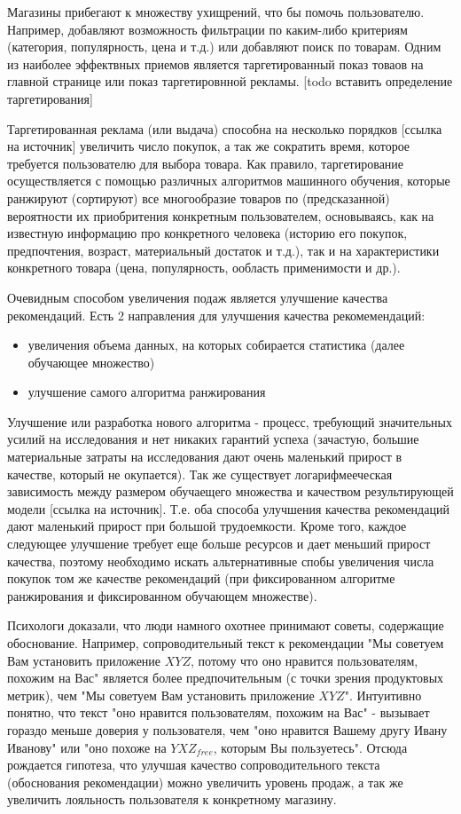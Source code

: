 \documentclass[12pt,a4paper]{report}
\begin{document}
Магазины прибегают к множеству ухищрений, что бы помочь пользователю. Например, добавляют возможность фильтрации по каким-либо критериям (категория, популярность, цена и т.д.) или добавляют поиск по товарам. Одним из наиболее эффектвных приемов является таргетированный показ товаов на главной странице или показ таргетировнной рекламы. [todo вставить определение таргетирования]

Таргетированная реклама (или выдача) способна на несколько порядков [ссылка на источник] увеличить число покупок, а так же сократить время, которое требуется пользователю для выбора товара.
Как правило, таргетирование осуществляется с помощью различных алгоритмов машинного обучения, которые ранжируют (сортируют) все многообразие товаров по (предсказанной) вероятности их приобритения конкретным пользователем, основываясь, как на известную информацию про конкретного человека (историю его покупок, предпочтения, возраст, материальный достаток и т.д.), так и на характеристики конкретного товара (цена, популярность, ообласть применимости и др.).

Очевидным способом увеличения подаж является улучшение качества рекомендаций. Есть 2 направления для улучшения качества рекомемендаций:
\begin{itemize}
\item увеличения объема данных, на которых собирается статистика (далее обучающее множество)
\item улучшение самого алгоритма ранжирования
\end{itemize}

Улучшение или разработка нового алгоритма - процесс, требующий значительных усилий на исследования и нет никаких гарантий успеха (зачастую, большие материальные затраты на исследования дают очень маленький прирост в качестве, который не окупается). Так же существует логарифмееческая зависимость между размером обучаещего множества и качеством результирующей модели [ссылка на источник]. Т.е. оба способа улучшения качества рекомендаций дают маленький прирост при большой трудоемкости.
Кроме того, каждое следующее улучшение требует еще больше ресурсов и дает меньший прирост качества, поэтому необходимо искать альтернативные спобы увеличения числа покупок том же качестве рекомендаций (при фиксированном алгоритме ранжирования и фиксированном обучающем множестве).

Психологи доказали, что люди намного охотнее принимают советы, содержащие обоснование. Например, сопроводительный текст к рекомендации "Мы советуем Вам установить приложение $XYZ$, потому что оно нравится пользователям, похожим на Вас" является более предпочительным (с точки зрения продуктовых метрик), чем "Мы советуем Вам установить приложение $XYZ$". Интуитивно понятно, что текст "оно нравится пользователям, похожим на Вас" - вызывает гораздо меньше доверия у пользователя, чем "оно нравится Вашему другу Ивану Иванову" или "оно похоже на $YXZ_{free}$, которым Вы пользуетесь". Отсюда рождается гипотеза, что улучшая качество сопроводительного текста (обоснования рекомендации) можно увеличить уровень продаж, а так же увеличить лояльность пользователя к конкретному магазину.
\end{document}
